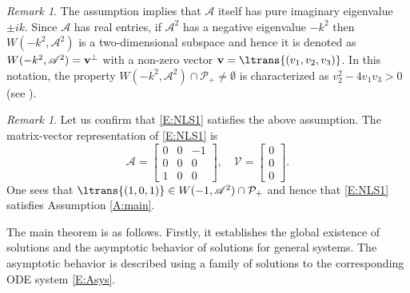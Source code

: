 \documentclass[11pt,a4paper,oneside]{amsart}
\theoremstyle{plain}
\theoremstyle{remark}
\newtheorem{remark}[theorem]{Remark}
\numberwithin{equation}{section}
\theoremstyle{definition}
\begin{document}
\begin{remark}
The assumption 
implies that $\mathscr{A}$ itself has pure imaginary eigenvalue $\pm i k$.
Since $\mathscr{A}$ has real entries, if $\mathscr{A}^2$ has a negative eigenvalue $-k^2$ then 
$W(-k^2,\mathscr{A}^2)$ is a two-dimensional subspace and hence it is  denoted as $W(-k^2,\mathscr{A}^2)={\bf v}^\perp$ with a non-zero vector ${\bf v} =\ltrans{(v_1,v_2,v_3)}$. 
In this notation,
the property $W(-k^2,\mathscr{A}^2) \cap \mathcal{P}_+\neq \emptyset$ is 
characterized as $v_2^2-4v_1v_3>0$
(see \cite[Theorem 3.1]{MSU1}).
\end{remark}
\begin{remark}
Let us confirm that \eqref{E:NLS1} satisfies the above assumption.
The matrix-vector representation of \eqref{E:NLS1} is
\begin{equation}\label{E:modelAV}
\mathscr{A}=
\begin{bmatrix}
0 & 0 & -1 \\
0 & 0 & 0 \\
1 & 0 & 0
\end{bmatrix}  
,\quad
	\mathscr{V}=
	\begin{bmatrix} 0 \\ 0 \\  0 \end{bmatrix}. 
\end{equation}
One sees that $\ltrans{(1,0,1)} \in W(-1,\mathscr{A}^2) \cap \mathcal{P}_+$ and hence that \eqref{E:NLS1} satisfies Assumption \ref{A:main}.
\end{remark}

The main theorem is as follows. Firstly, it establishes the global existence of solutions and the asymptotic behavior of solutions for general systems. The asymptotic behavior is described using a family of solutions to the corresponding ODE system \eqref{E:Asys}.
\end{document}
